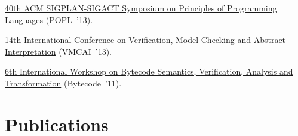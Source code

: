 \documentclass{article}
\begin{document}
\begin{description}[leftmargin=0cm]
    \item[External Review Committee.] \href{%
    http://popl.mpi-sws.org/2013/}{%
    40th ACM SIGPLAN-SIGACT Symposium on Principles of Programming Languages} (POPL ’13).


    \item[Program Committee.] \href{%
    http://vmcai13.di.univr.it/}{%
    14th International Conference on Verification, Model Checking and Abstract Interpretation} (VMCAI ’13).


    \item[Program Committee.] \href{%
    http://vmcai13.di.univr.it/}{%
    6th International Workshop on Bytecode Semantics, Verification, Analysis and Transformation} (Bytecode ’11).

  \end{description}

  \section*{Publications}
\end{document}

